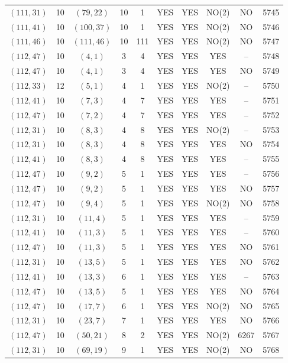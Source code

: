 \begin{longtable}{|c|c|c|c|c|c|c|c|c|c|}
$(111, 31)$ & 10 & $(79, 22)$ & 10 & 1 & YES & YES & NO(2) & NO & 5745\\
$(111, 41)$ & 10 & $(100, 37)$ & 10 & 1 & YES & YES & NO(2) & NO & 5746\\
$(111, 46)$ & 10 & $(111, 46)$ & 10 & 111 & YES & YES & NO(2) & NO & 5747\\
$(112, 47)$ & 10 & $(4, 1)$ & 3 & 4 & YES & YES & YES & -- & 5748\\
$(112, 47)$ & 10 & $(4, 1)$ & 3 & 4 & YES & YES & YES & NO & 5749\\
$(112, 33)$ & 12 & $(5, 1)$ & 4 & 1 & YES & YES & NO(2) & -- & 5750\\
$(112, 41)$ & 10 & $(7, 3)$ & 4 & 7 & YES & YES & YES & -- & 5751\\
$(112, 47)$ & 10 & $(7, 2)$ & 4 & 7 & YES & YES & YES & -- & 5752\\
$(112, 31)$ & 10 & $(8, 3)$ & 4 & 8 & YES & YES & NO(2) & -- & 5753\\
$(112, 31)$ & 10 & $(8, 3)$ & 4 & 8 & YES & YES & YES & NO & 5754\\
$(112, 41)$ & 10 & $(8, 3)$ & 4 & 8 & YES & YES & YES & -- & 5755\\
$(112, 47)$ & 10 & $(9, 2)$ & 5 & 1 & YES & YES & YES & -- & 5756\\
$(112, 47)$ & 10 & $(9, 2)$ & 5 & 1 & YES & YES & YES & NO & 5757\\
$(112, 47)$ & 10 & $(9, 4)$ & 5 & 1 & YES & YES & NO(2) & NO & 5758\\
$(112, 31)$ & 10 & $(11, 4)$ & 5 & 1 & YES & YES & YES & -- & 5759\\
$(112, 41)$ & 10 & $(11, 3)$ & 5 & 1 & YES & YES & YES & -- & 5760\\
$(112, 47)$ & 10 & $(11, 3)$ & 5 & 1 & YES & YES & YES & NO & 5761\\
$(112, 31)$ & 10 & $(13, 5)$ & 5 & 1 & YES & YES & YES & NO & 5762\\
$(112, 41)$ & 10 & $(13, 3)$ & 6 & 1 & YES & YES & YES & -- & 5763\\
$(112, 47)$ & 10 & $(13, 5)$ & 5 & 1 & YES & YES & YES & NO & 5764\\
$(112, 47)$ & 10 & $(17, 7)$ & 6 & 1 & YES & YES & NO(2) & NO & 5765\\
$(112, 31)$ & 10 & $(23, 7)$ & 7 & 1 & YES & YES & YES & NO & 5766\\
$(112, 47)$ & 10 & $(50, 21)$ & 8 & 2 & YES & YES & NO(2) & 6267 & 5767\\
$(112, 31)$ & 10 & $(69, 19)$ & 9 & 1 & YES & YES & NO(2) & NO & 5768\\

\end{longtable}
